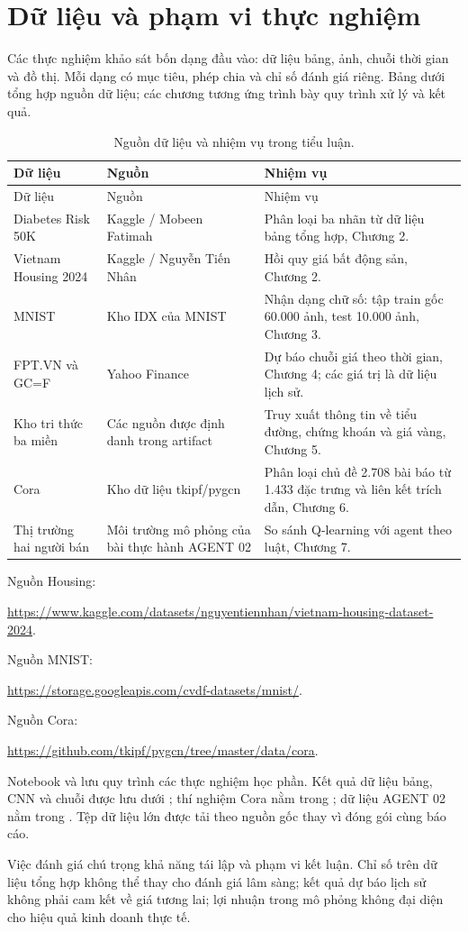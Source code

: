 \chapter*{Dữ liệu và phạm vi thực nghiệm}
Các thực nghiệm khảo sát bốn dạng đầu vào: dữ liệu bảng, ảnh, chuỗi thời gian và đồ thị. Mỗi dạng có mục tiêu, phép chia và chỉ số đánh giá riêng. Bảng dưới tổng hợp nguồn dữ liệu; các chương tương ứng trình bày quy trình xử lý và kết quả.
\begin{longtable}{p{3cm}p{5cm}p{6cm}}\caption{Nguồn dữ liệu và nhiệm vụ trong tiểu luận.}\\\toprule Dữ liệu & Nguồn & Nhiệm vụ\\\midrule\endfirsthead\toprule Dữ liệu & Nguồn & Nhiệm vụ\\\midrule\endhead
Diabetes Risk 50K & Kaggle / Mobeen Fatimah & Phân loại ba nhãn từ dữ liệu bảng tổng hợp, Chương 2.\\
Vietnam Housing 2024 & Kaggle / Nguyễn Tiến Nhân & Hồi quy giá bất động sản, Chương 2.\\
MNIST & Kho IDX của MNIST & Nhận dạng chữ số: tập train gốc 60.000 ảnh, test 10.000 ảnh, Chương 3.\\
FPT.VN và GC=F & Yahoo Finance & Dự báo chuỗi giá theo thời gian, Chương 4; các giá trị là dữ liệu lịch sử.\\
Kho tri thức ba miền & Các nguồn được định danh trong artifact & Truy xuất thông tin về tiểu đường, chứng khoán và giá vàng, Chương 5.\\
Cora & Kho dữ liệu tkipf/pygcn & Phân loại chủ đề 2.708 bài báo từ 1.433 đặc trưng và liên kết trích dẫn, Chương 6.\\
Thị trường hai người bán & Môi trường mô phỏng của bài thực hành AGENT 02 & So sánh Q-learning với agent theo luật, Chương 7.\\\bottomrule\end{longtable}
Nguồn Housing: \par\noindent\url{https://www.kaggle.com/datasets/nguyentiennhan/vietnam-housing-dataset-2024}.\par  Nguồn MNIST: \par\noindent\url{https://storage.googleapis.com/cvdf-datasets/mnist/}.\par  Nguồn Cora: \par\noindent\url{https://github.com/tkipf/pygcn/tree/master/data/cora}.\par 

Notebook  và  lưu quy trình các thực nghiệm học phần. Kết quả dữ liệu bảng, CNN và chuỗi được lưu dưới ; thí nghiệm Cora nằm trong ; dữ liệu AGENT 02 nằm trong . Tệp dữ liệu lớn được tải theo nguồn gốc thay vì đóng gói cùng báo cáo.

Việc đánh giá chú trọng khả năng tái lập và phạm vi kết luận. Chỉ số trên dữ liệu tổng hợp không thể thay cho đánh giá lâm sàng; kết quả dự báo lịch sử không phải cam kết về giá tương lai; lợi nhuận trong mô phỏng không đại diện cho hiệu quả kinh doanh thực tế.
